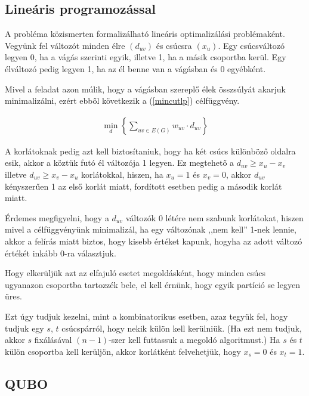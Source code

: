 \subsection{Lineáris programozással}\label{sec:theoryMinCutLP}
A probléma közismerten formalizálható lineáris optimalizálási problémaként.
Vegyünk fel változót minden élre $(d_{uv})$ és csúcsra $(x_{u})$. Egy csúcsváltozó legyen 0, ha a vágás szerinti egyik, illetve 1, ha a másik csoportba kerül. Egy élváltozó pedig legyen 1, ha az él benne van a vágásban és 0 egyébként.

Mivel a feladat azon múlik, hogy a vágásban szereplő élek összsúlyát akarjuk minimalizálni, ezért ebből következik a (\ref{mincutlp}) célfüggvény.

\begin{align} 
	\min_{d} \left\{ \sum_ {uv \in E(G)}{w_{uv}\cdot d_{uv}} \right\} \label{mincutlp}
\end{align}

A korlátoknak pedig azt kell biztosítaniuk, hogy ha két csúcs különböző oldalra esik, akkor a köztük futó él változója 1 legyen. Ez megtehető a $d_{uv} \geq x_u - x_v$ illetve $d_{uv} \geq x_v - x_u$ korlátokkal, hiszen, ha $x_u=1$ és $x_v=0$, akkor $d_{uv}$ kényszerűen 1 az első korlát miatt, fordított esetben pedig a második korlát miatt.

Érdemes megfigyelni, hogy a $d_{uv}$ változók 0 létére nem szabunk korlátokat, hiszen mivel a célfüggvényünk minimalizál, ha egy változónak ,,nem kell'' 1-nek lennie, akkor a felírás miatt biztos, hogy kisebb értéket kapunk, hogyha az adott változó értékét inkább 0-ra választjuk.

Hogy elkerüljük azt az elfajuló esetet megoldásként, hogy minden csúcs ugyanazon csoportba tartozzék bele, el kell érnünk, hogy egyik partíció se legyen üres. 

Ezt úgy tudjuk kezelni, mint a kombinatorikus esetben, azaz tegyük fel, hogy tudjuk egy $s$, $t$ csúcspárról, hogy nekik külön kell kerülniük. (Ha ezt nem tudjuk, akkor $s$ fixálásával $(n-1)$-szer kell futtassuk a megoldó algoritmust.)
Ha $s$ és $t$ külön csoportba kell kerüljön, akkor korlátként felvehetjük, hogy $x_s=0$ és $x_t=1$.





\subsection{QUBO}\label{sec:theoryMinCutQUBO}

